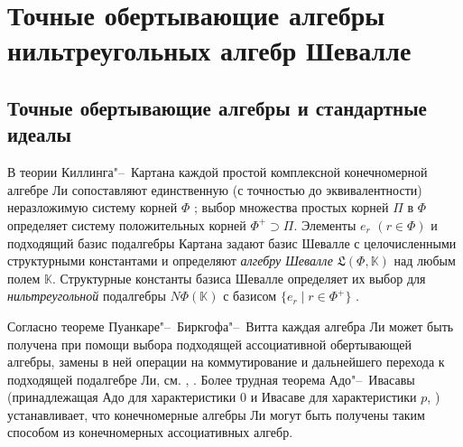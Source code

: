 \documentclass[a4paper,14pt,oneside,openany]{memoir}
\begin{document}
\gappto\captionsrussian{} %



\chapter{Точные обертывающие алгебры нильтреугольных алгебр Шевалле}\label{ch:enveloping}

\section{Точные обертывающие алгебры и стандартные идеалы}\label{sec:enveloping}
%
В теории Киллинга"--~Картана каждой простой комплексной конечномерной алгебре
Ли сопоставляют единственную (с точностью до эквивалентности) неразложимую
систему корней $\Phi$ \cite[глава~3]{carter72}; выбор множества простых корней
$\Pi$ в $\Phi$ определяет систему положительных корней $\Phi^+\supset\Pi$.
Элементы $e_r$ $(r\in\Phi)$ и подходящий базис подалгебры Картана задают
\cite{Chev-55} базис Шевалле с целочисленными структурными константами и
определяют \emph{алгебру Шевалле} $\mathfrak{L}(\Phi,\mathbb{K})$ над любым
полем $\mathbb{K}$. Структурные константы базиса Шевалле определяет их выбор
для \emph{нильтреугольной} подалгебры $N\Phi(\mathbb{K})$ с базисом $\{e_r\mid
r\in\Phi^+\}$ \cite[\S~4.2]{carter72}.

Согласно теореме Пуанкаре"--~Биркгофа"--~Витта каждая алгебра Ли может быть
получена при помощи выбора подходящей ассоциативной обертывающей алгебры,
замены в ней операции на коммутирование и дальнейшего перехода к подходящей
подалгебре Ли, см. \cite[\S~17]{humphreys-ru}, \cite[\S~V.9]{Kurosh1973}. Более
трудная теорема Адо"--~Ивасавы (принадлежащая Адо для характеристики $0$ и
Ивасаве для характеристики $p$, \cite[глава VI]{jacobson-ru}) устанавливает,
что конечномерные алгебры Ли могут быть получены таким способом из
конечномерных ассоциативных алгебр.
\end{document}
